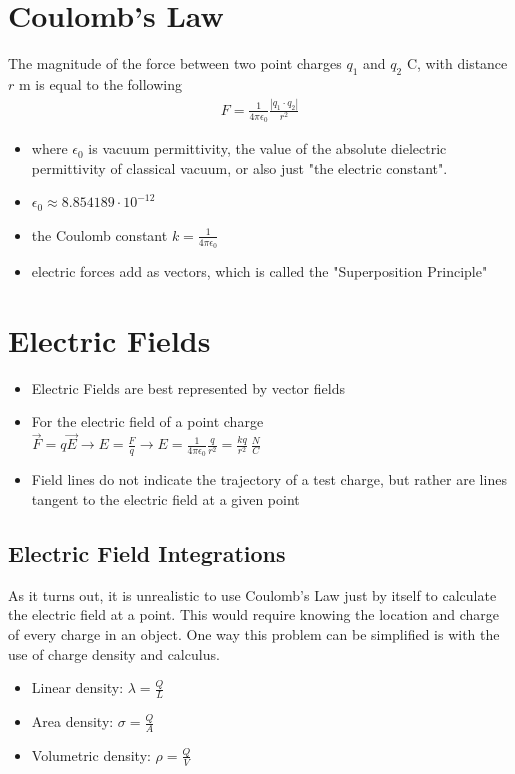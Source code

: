\documentclass[10pt, a4paper, twocolumn]{article}
\begin{document}
    \section{Coulomb's Law}    
        The magnitude of the force between two point charges $q_1$ and $q_2$ C, with distance $r$ m is equal to the following
        \begin{align*} 
            F = \frac{1}{4\pi \epsilon_0} \frac{|q_1 \cdot q_2|}{r^2}
        \end{align*} 
        \begin{itemize}
            \item where $\epsilon_0$ is vacuum permittivity, the value of the absolute dielectric permittivity of classical vacuum, or also just "the electric constant".  
            \item $\epsilon_0 \approx 8.854189 \cdot 10^{-12}$ 
            \item the Coulomb constant $k = \frac{1}{4\pi \epsilon_0}$
            \item electric forces add as vectors, which is called the "Superposition Principle"
        \end{itemize}


    \section{Electric Fields}
        \begin{itemize}
            \item Electric Fields are best represented by vector fields

            \item For the electric field of a point charge\\ $\vec{F} = q \vec{E} \rightarrow E = \frac{F}{q} \rightarrow E = \frac{1}{4\pi \epsilon_0} \frac{q}{r^2} = \frac{kq}{r^2}\ \frac{N}{C}$

            \item Field lines do not indicate the trajectory of a test charge, but rather are lines tangent to the electric field at a given point
        \end{itemize}

        \subsection{Electric Field Integrations}    
            As it turns out, it is unrealistic to use Coulomb's Law just by itself to calculate the electric field at a point. This would require knowing the location and charge of every charge in an object. One way this problem can be simplified is with the use of charge density and calculus. 
            \begin{itemize}
                \item Linear density: $\lambda = \frac{Q}{L}$
                \item Area density: $\sigma = \frac{Q}{A}$
                \item Volumetric density: $\rho = \frac{Q}{V}$
            \end{itemize}
\end{document}
